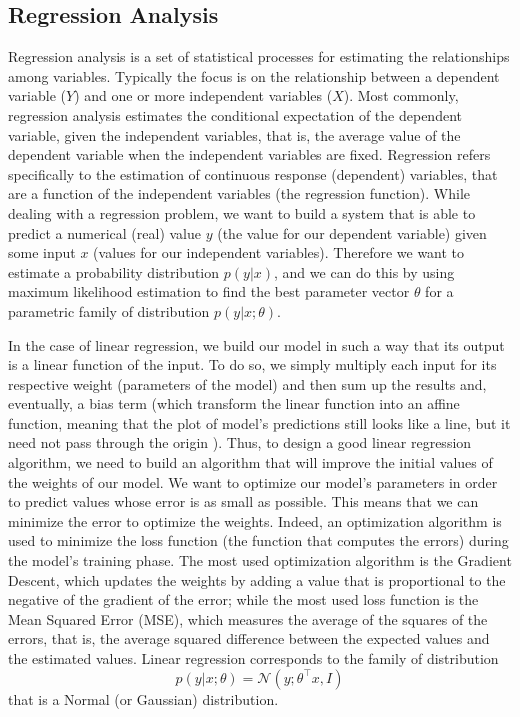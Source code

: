 \documentclass[10pt,journal,A4paper,compsoc,epsfig]{IEEEtran}
\begin{document}
\subsection{Regression Analysis}
Regression analysis is a set of statistical processes for estimating the relationships among variables. Typically the focus is on the relationship between a dependent variable ($Y$) and one or more independent variables ($X$).
Most commonly, regression analysis estimates the conditional expectation of the dependent variable, given the independent variables, that is, the average value of the dependent variable when the independent variables are fixed.
Regression refers specifically to the estimation of continuous response (dependent) variables, that are a function of the independent variables (the regression function).
While dealing with a regression problem, we want to build a system that is able to predict a numerical (real) value $y$ (the value for our dependent variable) given some input $x$ (values for our independent variables). Therefore we want to estimate a probability distribution $p(y|x)$, and we can do this by using maximum likelihood estimation to find the best parameter vector $\theta$ for a parametric family of distribution $p(y|x;\theta)$.

In the case of linear regression, we build our model in such a way that its output is a linear function of the input. To do so, we simply multiply each input for its respective weight (parameters of the model) and then sum up the results and, eventually, a bias term (which transform the linear function into an affine function, meaning that the plot of model's predictions still looks like a line, but it need not pass through the origin \cite{lecun2015deep}). Thus, to design a good linear regression algorithm, we need to build an algorithm that will improve the initial values of the weights of our model. We want to optimize our model's parameters in order to predict values whose error is as small as possible. This means that we can minimize the error to optimize the weights. Indeed, an optimization algorithm is used to minimize the loss function (the function that computes the errors) during the model's training phase. The most used optimization algorithm is the Gradient Descent, which updates the weights by adding a value that is proportional to the negative of the gradient of the error; while the most used loss function is the Mean Squared Error (MSE), which measures the average of the squares of the errors, that is, the average squared difference between the expected values and the estimated values.
Linear regression corresponds to the family of distribution
\begin{equation}
p(y|x;\theta)=\mathcal{N}(y;{\theta}^\top x, I)
\end{equation}
that is a Normal (or Gaussian) distribution.
\end{document}
